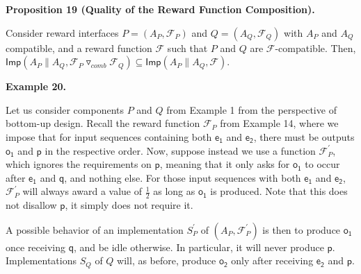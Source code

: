  
 
\par\medskip\noindent\textbf{Proposition 19 (Quality of the Reward Function Composition).}\par
 
 
Consider reward interfaces $P=(A_{P},\mathcal{F}_{P})$ and $Q=(A_{Q},\mathcal{F}_{Q})$ with $A_{P}$ and $A_{Q}$ compatible, and a reward function $\mathcal{F}$ such that $P$ and $Q$ are $\mathcal{F}$-compatible. Then, $\mathsf{Imp}(A_{P}\parallel A_{Q},{{\mathcal{F}_{P}}\mathbin{\triangledown_{\mathit{comb}}}{\mathcal{F}_{Q}}})\subseteq\mathsf{Imp}(A_{P}\parallel A_{Q},\mathcal{F})$.\par
 
 
 
 
\par\medskip\noindent\textbf{Example 20.}\par
 
 
Let us consider components $P$ and $Q$ from Example 1 from the perspective of bottom-up design. Recall the reward function $\mathcal{F}_{P}$ from Example 14, where we impose that for input sequences containing both $\mathsf{e_{1}}$ and $\mathsf{e_{2}}$, there must be outputs $\mathsf{o_{1}}$ and $\mathsf{p}$ in the respective order. Now, suppose instead we use a function $\mathcal{F}_{P}^{\prime}$, which ignores the requirements on $\mathsf{p}$, meaning that it only asks for $\mathsf{o_{1}}$ to occur after $\mathsf{e_{1}}$ and $\mathsf{q}$, and nothing else. For those input sequences with both $\mathsf{e_{1}}$ and $\mathsf{e_{2}}$, $\mathcal{F}_{P}^{\prime}$ will always award a value of $\frac{1}{2}$ as long as $\mathsf{o_{1}}$ is produced. Note that this does not disallow $\mathsf{p}$, it simply does not require it.\par
 
 
 
A possible behavior of an implementation $S_{P}^{\prime}$ of $(A_{P},\mathcal{F}_{P}^{\prime})$ is then to produce $\mathsf{o_{1}}$ once receiving $\mathsf{q}$, and be idle otherwise. In particular, it will never produce $\mathsf{p}$. Implementations $S_{Q}$ of $Q$ will, as before, produce $\mathsf{o_{2}}$ only after receiving $\mathsf{e_{2}}$ and $\mathsf{p}$.\par
 
